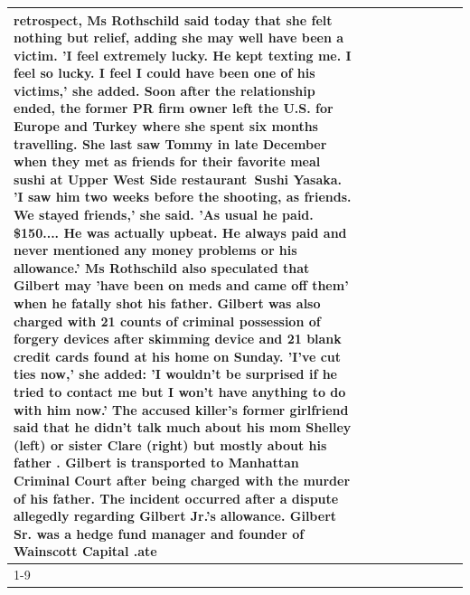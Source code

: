 \begin{table}[H]
\begin{tabular}{lllrlllll}
retrospect, Ms Rothschild said today that she felt nothing but relief, adding she may well have been a victim. 'I feel extremely lucky. He kept texting me. I feel so lucky. I feel I could have been one of his victims,' she added. Soon after the relationship ended, the former PR firm owner left the U.S. for Europe and Turkey where she spent six months  travelling. She last saw Tommy in late December when they met as friends for their favorite meal sushi at Upper West Side restaurant Sushi Yasaka. 'I saw him two weeks before the shooting, as friends. We stayed friends,' she said. 'As usual he paid. \$150.... He was actually upbeat. He always paid and never mentioned any money problems or his allowance.' Ms Rothschild also speculated that Gilbert may 'have been on meds and came off them' when he fatally shot his father. Gilbert was also charged with 21 counts of criminal possession of forgery devices after skimming device and 21 blank credit cards found at his home on Sunday. 'I've cut ties now,' she added: 'I wouldn’t be surprised if he tried to contact me but I won’t have anything to do with him now.' The accused killer's former girlfriend said that he didn't talk much about his mom Shelley (left) or sister Clare (right) but mostly about his father . Gilbert is transported to Manhattan Criminal Court  after being charged with the murder of his father. The incident occurred after a dispute allegedly regarding Gilbert Jr.'s allowance. Gilbert Sr. was a hedge fund manager and founder of Wainscott Capital .ate \\
\cline{1-9} \cline{2-9}

\end{tabular}
\end{table}
